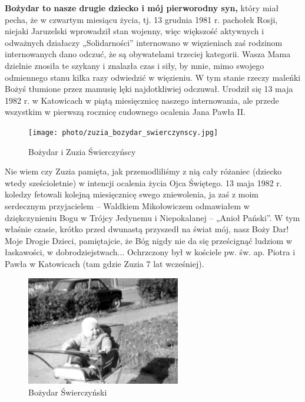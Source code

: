 \clearpage

\textbf{Bożydar to nasze drugie dziecko i mój pierworodny syn,} który miał pecha, że w czwartym miesiącu życia, tj. 13 grudnia 1981 r. pachołek Rosji, niejaki Jaruzelski wprowadził stan wojenny, więc większość aktywnych i odważnych działaczy „Solidarności” internowano w więzieniach zaś rodzinom internowanych dano odczuć, że są obywatelami trzeciej kategorii. Wasza Mama dzielnie znosiła te szykany i znalazła czas i siły, by mnie, mimo swojego odmiennego stanu kilka razy odwiedzić w więzieniu. W tym stanie rzeczy maleńki Bożyś tłumione przez mamusię lęki najdotkliwiej odczuwał. Urodził się 13 maja 1982 r. w Katowicach w piątą miesięcznicę naszego internowania, ale przede wszystkim w pierwszą rocznicę cudownego ocalenia Jana Pawła II.
\begin{figure}[!h]
\begin{center}
\texttt{[image: photo/zuzia\_bozydar\_swierczynscy.jpg]}
\caption{Bożydar i Zuzia Świerczyńscy}
\end{center}
\end{figure}

Nie wiem czy Zuzia pamięta, jak przemodliliśmy z nią cały różaniec (dziecko wtedy sześcioletnie) w intencji ocalenia życia Ojca Świętego. 13 maja 1982 r. koledzy fetowali kolejną miesięcznicę swego zniewolenia, ja zaś z moim serdecznym przyjacielem – Waldkiem Mikołowiczem odmawiałem w dziękczynieniu Bogu w Trójcy Jedynemu i Niepokalanej – „Anioł Pański”. W tym właśnie czasie, krótko przed dwunastą przyszedł na świat mój, nasz Boży Dar! Moje Drogie Dzieci, pamiętajcie, że Bóg nigdy nie da się prześcignąć ludziom w łaskawości, w dobrodziejstwach... Ochrzczony był w kościele pw. św. ap. Piotra i Pawła w Katowicach (tam gdzie Zuzia 7 lat wcześniej).
\begin{figure}[!h]
\begin{center}
\includegraphics[width=0.6\textwidth]{photo/bozydar_swierczynski_1.jpg}
\caption{Bożydar Świerczyński}
\end{center}
\end{figure}

